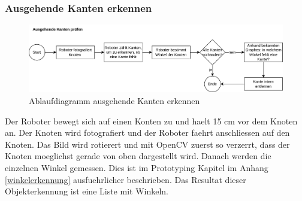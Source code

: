 \subsubsection{Ausgehende Kanten erkennen}

\begin{figure}[H]
\centering
\includegraphics[width=\textwidth]{assets/gesamtkonzept/ablaufdiagramm-kanten-erkennen.png}
\caption{Ablaufdiagramm ausgehende Kanten erkennen}
\label{fig:ablaufdiagramm-kanten-erkennen}
\end{figure}

Der Roboter bewegt sich auf einen Konten zu und haelt 15 cm vor dem Knoten an. Der Knoten wird fotografiert und der Roboter faehrt anschliessen auf den Knoten. Das Bild wird rotierert und mit OpenCV zuerst so verzerrt, dass der Knoten moeglichst gerade von oben dargestellt wird. Danach werden die einzelnen Winkel gemessen. Dies ist im Prototyping Kapitel im Anhang \ref{winkelerkennung} ausfuehrlicher beschrieben. Das Resultat dieser Objekterkennung ist eine Liste mit Winkeln.

